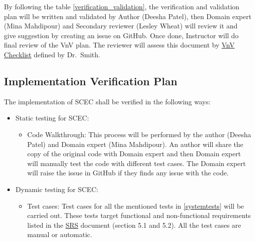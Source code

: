 \documentclass[12pt, titlepage]{article}
\begin{document}
By following the table \ref{verification_validation}, the verification and validation plan will be written and validated by Author (Deesha Patel), then Domain expert (Mina Mahdipour) and Secondary reviewer (Lesley Wheat) will review it and give suggestion by creating an issue on GitHub. Once done, Instructor will do final review of the VnV plan. The reviewer will assess this document by  \href{https://github.com/smiths/capTemplate/blob/9251702fdcb9800c59f6ed3d11d91e2bd62fca6d/docs/Checklists/VnV-Checklist.pdf}{VnV Checklist} defined by Dr.\ Smith.     

\subsection{Implementation Verification Plan}

The implementation of SCEC shall be verified in the following ways:

\begin{itemize}

\item Static testing for SCEC:

\begin{itemize}


\item Code Walkthrough: This process will be performed by the author (Deesha Patel) and Domain expert (Mina Mahdipour). An author will share the copy of the original code with Domain expert and then Domain expert will manually test the code with different test cases. The Domain expert will raise the issue in GitHub if they finds any issue with the code.

\end{itemize}
\end{itemize}

\begin{itemize}

\item Dynamic testing for SCEC:

\begin{itemize}


\item Test cases: Test cases for all the mentioned tests in \autoref{systemtests} will be carried out. These tests target functional and non-functional requirements listed in the \href{https://github.com/DeeshaPatel/CAS-741-Solar-Cooker/blob/7c53c8d9a19ca2f94dfba6ba9208eae0bf03b8cc/docs/SRS/SRS.pdf}{SRS} document (section 5.1 and 5.2). All the test cases are manual or automatic.  

\end{itemize}
\end{itemize}
\end{document}
